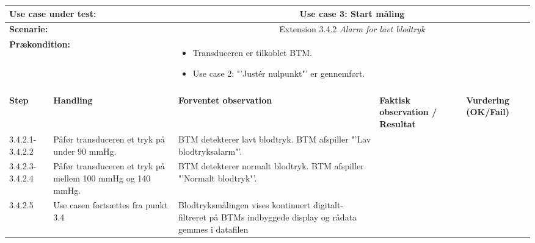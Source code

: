 \begin{tabular}{|p{1cm}|p{3cm}|p{4cm}|p{4cm}|p{2cm}|}
\hline
\multicolumn{2}{|p{3cm}|}{\textbf{Use case under test:}} & \multicolumn{3}{c|}{Use case 3: Start måling} \\\hline

\multicolumn{2}{|p{3cm}|}{\textbf{Scenarie:}} & \multicolumn{3}{c|}{Extension 3.4.2 \textit{Alarm for lavt blodtryk}} \\\hline

\multicolumn{2}{|p{3cm}|}{\textbf{Prækondition:}}  & \multicolumn{3}{l|}{\parbox{0.6\textwidth}{
\begin{itemize}[label=$\circ$]
\item Transduceren er tilkoblet BTM.
\item Use case 2: "'Justér nulpunkt"' er gennemført.  
\end{itemize} }}\\\hline

\multicolumn{5}{|c|}{} \\\hline

\textbf{Step} & \textbf{Handling} & \textbf{Forventet observation} & \textbf{Faktisk observation / Resultat} & \textbf{Vurdering (OK/Fail)}\\\hline

3.4.2.1-3.4.2.2 & Påfør transduceren et tryk på under 90 mmHg. & BTM detekterer lavt blodtryk. BTM afspiller "'Lav blodtryksalarm"'.  & & 
\\\hline
3.4.2.3-3.4.2.4 & Påfør transduceren et tryk på mellem 100 mmHg og 140 mmHg. & BTM detekterer normalt blodtryk. BTM afspiller "'Normalt blodtryk"'.  & & 
\\\hline
3.4.2.5 & Use casen fortsættes fra punkt 3.4 & Blodtryksmålingen vises kontinuert digitalt-filtreret på BTMs indbyggede display og rådata gemmes i datafilen & & 
\\\hline

\end{tabular}

\newpage

